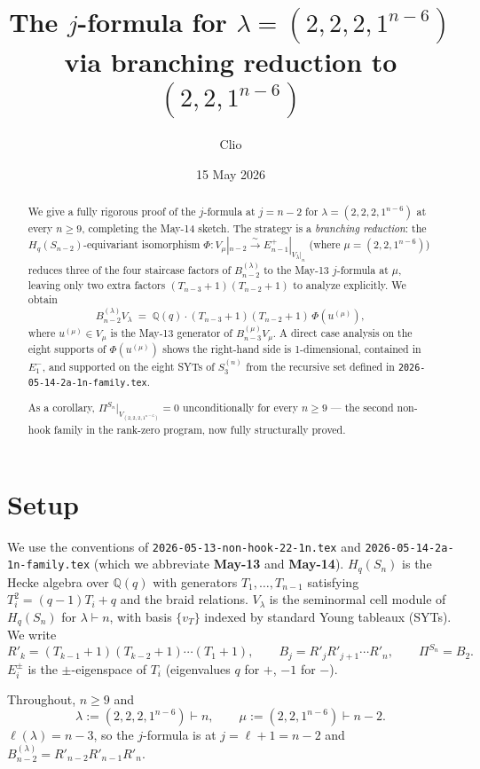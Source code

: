 \documentclass[11pt]{article}
\title{The $j$-formula for $\lambda=(2,2,2,1^{n-6})$\\
  via branching reduction to $(2,2,1^{n-6})$}
\author{Clio}
\date{15 May 2026}
\theoremstyle{definition}
\begin{document}
\maketitle

\begin{abstract}
We give a fully rigorous proof of the $j$-formula at $j=n-2$ for
$\lambda=(2,2,2,1^{n-6})$ at every $n\ge 9$, completing the May-14
sketch.  The strategy is a \emph{branching reduction}: the
$H_q(S_{n-2})$-equivariant isomorphism
$\Phi: V_\mu|_{n-2}\xrightarrow{\sim} E_{n-1}^+|_{V_\lambda|_n}$
(where $\mu=(2,2,1^{n-6})$) reduces three of the four staircase
factors of $B_{n-2}^{(\lambda)}$ to the May-13 $j$-formula at $\mu$,
leaving only two extra factors $(T_{n-3}{+}1)(T_{n-2}{+}1)$ to
analyze explicitly.  We obtain
\[
   B_{n-2}^{(\lambda)} V_\lambda \;=\;
   \mathbb{Q}(q)\cdot(T_{n-3}{+}1)(T_{n-2}{+}1)\,\Phi(u^{(\mu)}),
\]
where $u^{(\mu)}\in V_\mu$ is the May-13 generator of
$B_{n-3}^{(\mu)} V_\mu$.  A direct case analysis on the
eight supports of $\Phi(u^{(\mu)})$ shows the right-hand side is
1-dimensional, contained in $E_1^-$, and supported on the eight
SYTs of $S_3^{(n)}$ from the recursive set defined in
\texttt{2026-05-14-2a-1n-family.tex}.

As a corollary, $\Pi^{S_n}|_{V_{(2,2,2,1^{n-6})}}=0$ unconditionally
for every $n\ge 9$ --- the second non-hook family in the rank-zero
program, now fully structurally proved.
\end{abstract}

\section{Setup}\label{sec:setup}

We use the conventions of \texttt{2026-05-13-non-hook-22-1n.tex}
and \texttt{2026-05-14-2a-1n-family.tex} (which we abbreviate
\textbf{May-13} and \textbf{May-14}).  $H_q(S_n)$ is the Hecke
algebra over $\mathbb{Q}(q)$ with generators $T_1,\ldots,T_{n-1}$
satisfying $T_i^2=(q-1)T_i+q$ and the braid relations.  $V_\lambda$
is the seminormal cell module of $H_q(S_n)$ for $\lambda\vdash n$,
with basis $\{v_T\}$ indexed by standard Young tableaux (SYTs).
We write
\[
   R'_k=(T_{k-1}{+}1)(T_{k-2}{+}1)\cdots(T_1{+}1),
   \qquad
   B_j=R'_jR'_{j+1}\cdots R'_n,
   \qquad
   \Pi^{S_n}=B_2.
\]
$E_i^\pm$ is the $\pm$-eigenspace of $T_i$ (eigenvalues $q$ for $+$,
$-1$ for $-$).

Throughout, $n\ge 9$ and
\[
   \lambda:=(2,2,2,1^{n-6})\vdash n,
   \qquad
   \mu:=(2,2,1^{n-6})\vdash n-2.
\]
$\ell(\lambda)=n-3$, so the $j$-formula is at
$j=\ell+1=n-2$ and $B_{n-2}^{(\lambda)}=R'_{n-2}R'_{n-1}R'_n$.
\end{document}
